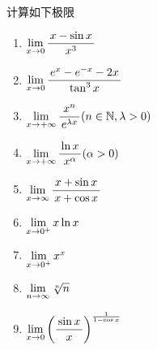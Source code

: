 \egz 计算如下极限
\begin{enumerate}[(1)]
  \setlength{\itemindent}{1cm}
  \item $\limx{0}\df{x-\sin x}{x^3}$ 
  \item $\limx{0}\df{e^x-e^{-x}-2x}{\tan^3x}$ 
  \item $\limx{+\infty}\df{x^n}{e^{\lambda
  x}}(n\in\mathbb{N},\lambda>0)$ 
  \item $\limx{+\infty}\df{\ln x}{x^\alpha}(\alpha>0)$ 
  \item $\limx{\infty}\df{x+\sin x}{x+\cos x}$
  \item $\limx{0^+}x\ln x$
  \item $\limx{0^+}x^x$
  \item $\limn\sqrt[n]n$
  \item $\limx0\left(\df{\sin x}x\right)^{\frac1{1-\cos x}}$
\end{enumerate}

